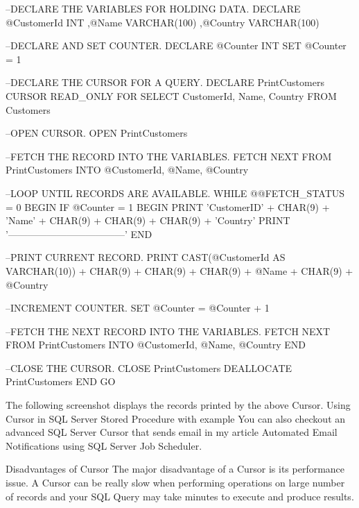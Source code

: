       --DECLARE THE VARIABLES FOR HOLDING DATA.
      DECLARE @CustomerId INT
             ,@Name VARCHAR(100)
             ,@Country VARCHAR(100)
 
      --DECLARE AND SET COUNTER.
      DECLARE @Counter INT
      SET @Counter = 1
 
      --DECLARE THE CURSOR FOR A QUERY.
      DECLARE PrintCustomers CURSOR READ_ONLY
      FOR
      SELECT CustomerId, Name, Country
      FROM Customers
 
      --OPEN CURSOR.
      OPEN PrintCustomers
 
      --FETCH THE RECORD INTO THE VARIABLES.
      FETCH NEXT FROM PrintCustomers INTO
      @CustomerId, @Name, @Country
 
      --LOOP UNTIL RECORDS ARE AVAILABLE.
      WHILE @@FETCH_STATUS = 0
      BEGIN
             IF @Counter = 1
             BEGIN
                        PRINT 'CustomerID' + CHAR(9) + 'Name' + CHAR(9) + CHAR(9) + CHAR(9) + 'Country'
                        PRINT '------------------------------------'
             END
 
             --PRINT CURRENT RECORD.
             PRINT CAST(@CustomerId AS VARCHAR(10)) + CHAR(9) + CHAR(9) + CHAR(9) + @Name + CHAR(9) + @Country
    
             --INCREMENT COUNTER.
             SET @Counter = @Counter + 1
 
             --FETCH THE NEXT RECORD INTO THE VARIABLES.
             FETCH NEXT FROM PrintCustomers INTO
             @CustomerId, @Name, @Country
      END
 
      --CLOSE THE CURSOR.
      CLOSE PrintCustomers
      DEALLOCATE PrintCustomers
END
GO
 
The following screenshot displays the records printed by the above Cursor.
Using Cursor in SQL Server Stored Procedure with example
You can also checkout an advanced SQL Server Cursor that sends email in my article Automated Email Notifications using SQL Server Job Scheduler.
 
 
Disadvantages of Cursor
The major disadvantage of a Cursor is its performance issue. A Cursor can be really slow when performing operations on large number of records and your SQL Query may take minutes to execute and produce results.

